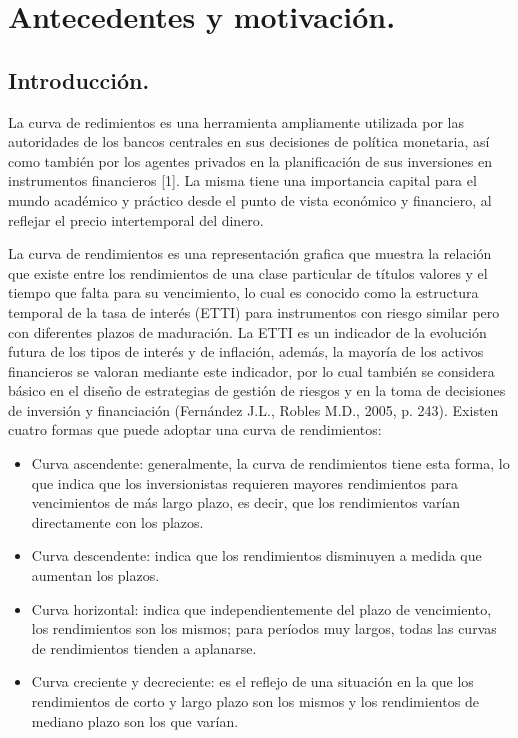 \chapter{Antecedentes y motivaci\'on.}

\section{Introducci\'on.}

\hspace*{0.4 cm} La curva de redimientos es una herramienta ampliamente utilizada por las autoridades de los bancos centrales en sus decisiones de pol\'itica monetaria, as\'i como tambi\'en por los agentes privados en la planificaci\'on de sus inversiones en instrumentos financieros [1]. La misma tiene una importancia capital
para el mundo acad\'emico y pr\'actico desde el punto de vista econ\'omico y financiero, al reflejar el precio intertemporal del dinero.


\hspace*{0.4 cm} La curva de rendimientos es una representaci\'on grafica que muestra la relaci\'on que existe entre los rendimientos de una clase particular de t\'itulos valores y el tiempo que falta para su vencimiento, lo cual es conocido como la estructura temporal de la tasa de inter\'es (ETTI) para instrumentos con riesgo similar pero con diferentes plazos de maduraci\'on. La ETTI es un indicador de la evoluci\'on futura de los tipos de inter\'es y de inflaci\'on, adem\'as, la mayor\'ia de los activos financieros se valoran mediante este indicador, por lo cual tambi\'en se considera b\'asico en el dise\~no de estrategias de gesti\'on de riesgos y en la toma de decisiones de inversi\'on y financiaci\'on (Fern\'andez J.L., Robles M.D., 2005, p. 243). Existen cuatro formas que puede adoptar una curva de rendimientos:

\begin{itemize}
  \item Curva ascendente: generalmente, la curva de rendimientos tiene esta forma, lo que indica que los inversionistas requieren mayores rendimientos para vencimientos de m\'as largo plazo, es decir, que los rendimientos var\'ian directamente con los plazos. 
  \item Curva descendente: indica que los rendimientos disminuyen a medida que aumentan los plazos.
  \item Curva horizontal: indica que independientemente del plazo de vencimiento, los rendimientos son los mismos; para per\'iodos muy largos, todas las curvas de rendimientos tienden a aplanarse.
  \item Curva creciente y decreciente: es el reflejo de una situaci\'on en la que los rendimientos de corto y largo plazo son los mismos y los rendimientos de mediano plazo son los que var\'ian.
\end{itemize}

